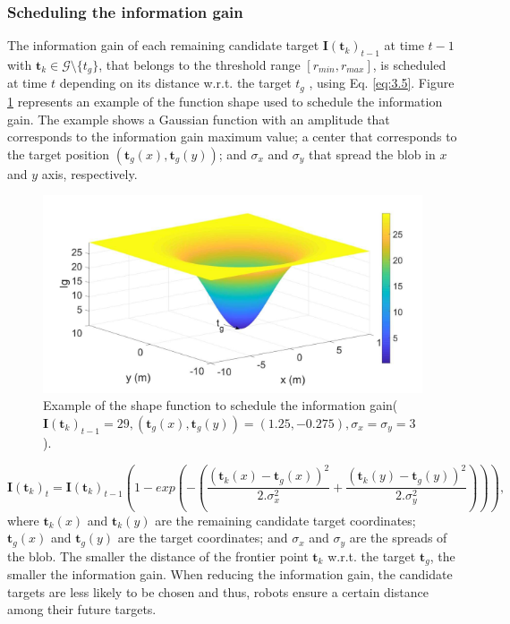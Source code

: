 \documentclass[11pt,openany]{book}
\begin{document}
\subsubsection{Scheduling the information gain}
The information gain of each remaining candidate target $\mathbf{I}(\mathbf{t}_k)_{t-1}$ at time $t-1$ with $\mathbf{t}_k \in \mathcal{G} \setminus \{t_g\}$, that belongs to the threshold range $[r_{min} , r_{max} ]$, is scheduled at time $t$ depending on its distance w.r.t. the target $t_g$ , using Eq. \ref{eq:3.5}. Figure \ref{fig:3.9} represents an example of the function shape used to schedule the information gain. The example shows a Gaussian function with an amplitude that corresponds to the information gain maximum value; a center that corresponds to the target position $(\mathbf{t}_g(x), \mathbf{t}_g(y))$; and $\sigma_x$ and $\sigma_y$ that spread the blob in $x$ and $y$ axis, respectively.
\begin{figure}[H]
    \centering
    \includegraphics[scale=0.6]{assets/3_9.png}
    \caption{Example of the shape function to schedule the information gain($\mathbf{I}(\mathbf{t}_k)_{t-1}=29,(\mathbf{t}_g(x),\mathbf{t}_g(y))=(1.25,-0.275), \sigma_x=\sigma_y=3$).}
    \label{fig:3.9}
\end{figure}
\begin{equation}\label{eq:3.5}
    \mathbf{I}(\mathbf{t}_k)_t=\mathbf{I}(\mathbf{t}_k)_{t-1}(1-exp(-(\frac{(\mathbf{t}_k(x)-\mathbf{t}_g(x))^2}{2.\sigma_x^2}+\frac{(\mathbf{t}_k(y)-\mathbf{t}_g(y))^2}{2.\sigma_y^2}))),
\end{equation}
where $\mathbf{t}_k(x)$ and $\mathbf{t}_k(y)$ are the remaining candidate target coordinates; $\mathbf{t}_g(x)$ and $\mathbf{t}_g(y)$ are the target coordinates; and $\sigma_x$ and $\sigma_y$ are the spreads of the blob. The smaller the distance of the frontier point $\mathbf{t}_k$ w.r.t. the target $\mathbf{t}_g$, the smaller the information gain. When reducing the information gain, the candidate targets are less likely to be chosen and thus, robots ensure a certain distance among their future targets.
\end{document}
